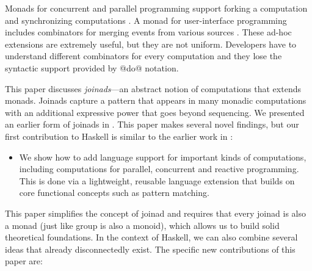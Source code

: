 \documentclass[preprint]{sigplanconf}
\begin{document}
Monads for concurrent \cite{poorman} and parallel programming \cite{parmonad} support forking a 
computation and synchronizing computations \cite{chp-monad}. A monad for user-interface programming 
includes combinators for merging events from various sources \cite{imperative-streams}. These 
ad-hoc extensions are extremely useful, but they are not uniform. Developers have to understand 
different combinators for every computation and they lose the syntactic support provided by @do@ notation.

This paper discusses \textit{joinads}---an abstract notion of computations that extends monads.
Joinads capture a pattern that appears in many monadic computations with an additional expressive 
power that goes beyond sequencing. We presented an earlier form of joinads in \fsharp \cite{joinads}. 
This paper makes several novel findings, but our first contribution to Haskell is similar to the 
earlier work in \fsharp:

\begin{itemize}
\item  We show how to add language support for important kinds of computations, including computations 
  for parallel, concurrent and reactive programming. This is done via a lightweight, reusable language 
  extension that builds on core functional concepts such as pattern matching.
\end{itemize}
This paper simplifies the concept of joinad and requires that every joinad is also a monad (just like
group is also a monoid), which allows us to build solid theoretical foundations. In the context of 
Haskell, we can also combine several ideas that already disconnectedly exist. The specific new 
contributions of this paper are:
\end{document}
